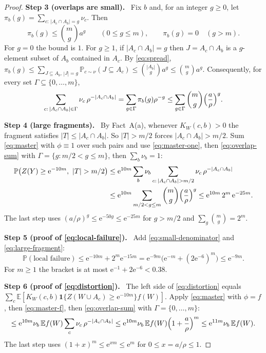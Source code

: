 \documentclass[11pt]{article}
\numberwithin{equation}{section}
\newcommand{\PP}{\mathbb P}
\newcommand{\EE}{\mathbb E}
\newcommand{\ind}{\mathbf 1}
\newcommand{\ee}{\mathrm e}
\newcommand{\step}[2]{\medskip\noindent\textbf{Step #1 (#2).}\ }
\begin{document}
\begin{proof}
\step{3}{overlaps are small}
Fix $b$ and, for an integer $g\ge0$, let
$\pi_b(g)=\sum_{c:\,|A_c\cap A_b|=g}\nu_c$. Then
\begin{equation}\label{eq:overlap}
 \pi_b(g)\le\binom mg a^g\qquad(0\le g\le m),
 \qquad \pi_b(g)=0\quad(g>m).
\end{equation}
For $g=0$ the bound is $1$. For $g\ge1$, if $|A_c\cap A_b|=g$ then
$J=A_c\cap A_b$ is a $g$-element subset of $A_b$ contained in $A_c$.
By \eqref{eq:spread},
$\pi_b(g)\le\sum_{J\subseteq A_b,\,|J|=g}\PP_{c\sim\nu}(J\subseteq A_c)
\le\binom{|A_b|}{g}a^g\le\binom mg a^g$. Consequently, for every set
$\Gamma\subseteq\{0,\dots,m\}$,
\begin{equation}\label{eq:overlap-sum}
 \sum_{c:\,|A_c\cap A_b|\in\Gamma}\nu_c\,\rho^{-|A_c\cap A_b|}
 =\sum_{g\in\Gamma}\pi_b(g)\rho^{-g}
 \le\sum_{g\in\Gamma}\binom mg\Bigl(\frac a\rho\Bigr)^{g}.
\end{equation}

\step{4}{large fragments}
By Fact~A(a), whenever $K_W(c,b)>0$ the fragment satisfies
$|T|\le|A_c\cap A_b|$. So $|T|>m/2$ forces $|A_c\cap A_b|>m/2$. Sum
\eqref{eq:master} with $\phi\equiv1$ over such pairs and use
\eqref{eq:master-one}, then \eqref{eq:overlap-sum} with
$\Gamma=\{g:m/2<g\le m\}$, then $\sum_b\nu_b=1$:
\begin{align}
 \PP\bigl(Z(Y)\ge\ee^{-10m},\ |T|>m/2\bigr)
 &\le\ee^{10m}\sum_{b}\nu_b\sum_{c:\,|A_c\cap A_b|>m/2}
      \nu_c\,\rho^{-|A_c\cap A_b|}\notag\\
 &\le\ee^{10m}\sum_{m/2<g\le m}\binom mg\Bigl(\frac a\rho\Bigr)^{g}
 \le\ee^{10m}\,2^m\,\ee^{-25m}.\label{eq:large-fragment}
\end{align}
The last step uses $(a/\rho)^g\le\ee^{-50g}\le\ee^{-25m}$ for $g>m/2$
and $\sum_g\binom mg=2^m$.

\step{5}{proof of \eqref{eq:local-failure}}
Add \eqref{eq:small-denominator} and \eqref{eq:large-fragment}:
\[
 \PP(\text{local failure})\le\ee^{-10m}+2^m\ee^{-15m}
 =\ee^{-9m}\bigl(\ee^{-m}+(2\ee^{-6})^{m}\bigr)\le\ee^{-9m}.
\]
For $m\ge1$ the bracket is at most $\ee^{-1}+2\ee^{-6}<0.38$.

\step{6}{proof of \eqref{eq:distortion}}
The left side of \eqref{eq:distortion} equals
$\sum_c\EE[K_W(c,b)\ind\{Z(W\cup A_c)\ge\ee^{-10m}\}f(W)]$. Apply
\eqref{eq:master} with $\phi=f$, then \eqref{eq:master-f}, then
\eqref{eq:overlap-sum} with $\Gamma=\{0,\dots,m\}$:
\[
 \le\ee^{10m}\nu_b\,\EE f(W)\sum_{c}\nu_c\,\rho^{-|A_c\cap A_b|}
 \le\ee^{10m}\nu_b\,\EE f(W)\Bigl(1+\frac a\rho\Bigr)^{m}
 \le\ee^{11m}\nu_b\,\EE f(W).
\]
The last step uses $(1+x)^m\le\ee^{xm}\le\ee^{m}$ for
$0\le x=a/\rho\le1$.
\end{proof}
\end{document}

